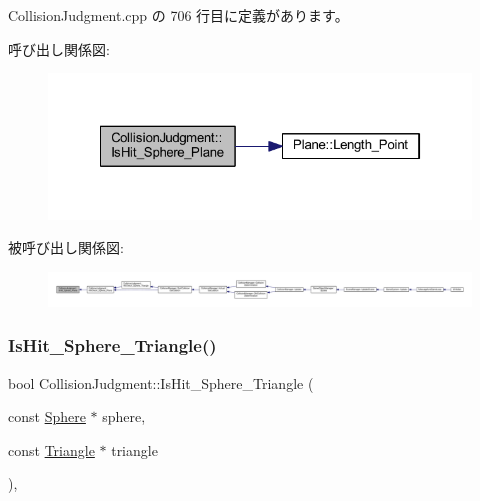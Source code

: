  Collision\+Judgment.\+cpp の 706 行目に定義があります。

呼び出し関係図\+:\nopagebreak
\begin{figure}[H]
\begin{center}
\leavevmode
\includegraphics[width=322pt]{class_collision_judgment_a7ec99cbf152e28907e2770ed44a7cefa_cgraph}
\end{center}
\end{figure}
被呼び出し関係図\+:
\nopagebreak
\begin{figure}[H]
\begin{center}
\leavevmode
\includegraphics[width=350pt]{class_collision_judgment_a7ec99cbf152e28907e2770ed44a7cefa_icgraph}
\end{center}
\end{figure}
\mbox{\label{class_collision_judgment_a3a594014c7ee4ba7adae21f2da9c7612}} 
\subsubsection{\texorpdfstring{Is\+Hit\+\_\+\+Sphere\+\_\+\+Triangle()}{IsHit\_Sphere\_Triangle()}}
{\footnotesize\ttfamily bool Collision\+Judgment\+::\+Is\+Hit\+\_\+\+Sphere\+\_\+\+Triangle (\begin{DoxyParamCaption}\item[{const \mbox{\hyperlink{class_sphere}{Sphere}} $\ast$}]{sphere,  }\item[{const \mbox{\hyperlink{class_triangle}{Triangle}} $\ast$}]{triangle }\end{DoxyParamCaption})\hspace{0.3cm}{\ttfamily [static]}, {\ttfamily [private]}}



